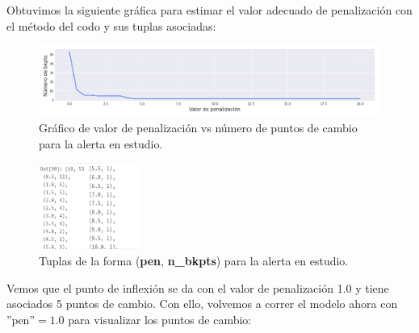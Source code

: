 \documentclass{article}[14pts]
\begin{document}
    Obtuvimos la siguiente gráfica para estimar el valor adecuado de penalización con el método del codo y sus tuplas asociadas:

      \begin{center}
        \begin{figure}[h]
          \centering
          \includegraphics[width=.85\textwidth]{images/5.png}
          \caption{Gráfico de valor de penalización vs número de puntos de cambio para la alerta en estudio.}
        \end{figure}    
      \end{center}

      \begin{center}
        \begin{figure}[h]
          \centering
          \includegraphics[width=0.3\textwidth]{images/6.png}
          \caption{Tuplas de la forma (\textbf{pen}, \textbf{n\_bkpts}) para la alerta en estudio.}
        \end{figure}    
      \end{center}

    Vemos que el punto de inflexión se da con el valor de penalización 1.0 y tiene asociados 5 puntos de cambio. Con ello, volvemos a correr el modelo ahora con $\text{''pen''}= 1.0$ para visualizar los puntos de cambio:
\end{document}
